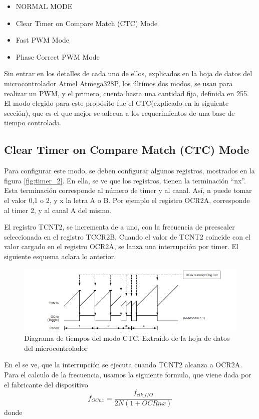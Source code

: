 \begin{itemize}
	\item NORMAL MODE 
	\item Clear Timer on Compare Match (CTC) Mode
	\item Fast PWM Mode 
	\item Phase Correct PWM Mode
\end{itemize}

Sin entrar en los detalles de cada uno de ellos, explicados en la hoja de datos del microcontrolador Atmel Atmega328P, los últimos dos modos, se usan para realizar un PWM, y el primero, cuenta hasta una cantidad fija, definida en 255. El modo elegido para este propósito fue el CTC(explicado en la siguiente sección), que es el que mejor se adecua a los requerimientos de una base de tiempo controlada. 

\subsection{Clear Timer on Compare Match (CTC) Mode }

Para configurar este modo, se deben configurar algunos registros, mostrados en la figura \ref{fig:timer_2}. En ella, se ve que los registros, tienen la terminación ``nx''. Esta terminación corresponde al número de timer y al canal. Así, n puede tomar el valor 0,1 o 2, y x la letra A o B. Por ejemplo el registro OCR2A, corresponde al timer 2, y al canal A del mismo. 
 
El registro TCNT2, se incrementa de a uno, con la frecuencia de preescaler seleccionada en el registro TCCR2B. Cuando el valor de TCNT2 coincide con el valor cargado en el registro OCR2A, se lanza una interrupción por timer. El siguiente esquema aclara lo anterior. 

\begin{figure}[ht]
	\includegraphics{ctc_t2} 
	\caption{Diagrama de tiempos del modo CTC. Extraído de la hoja de datos del microcontrolador}
	\label{fig:ctc_isr}
\end{figure}

En el se ve, que la interrupción se ejecuta cuando TCNT2 alcanza a OCR2A. Para el calculo de la frecuencia, usamos la siguiente formula, que viene dada por el fabricante del dispositivo
\begin{equation} \label{eq:frec_clk_isr2}
	f_{OCnx} = \frac{f_{clk \_ I/O}}{2N(1+OCRnx)}
\end{equation}
donde 

